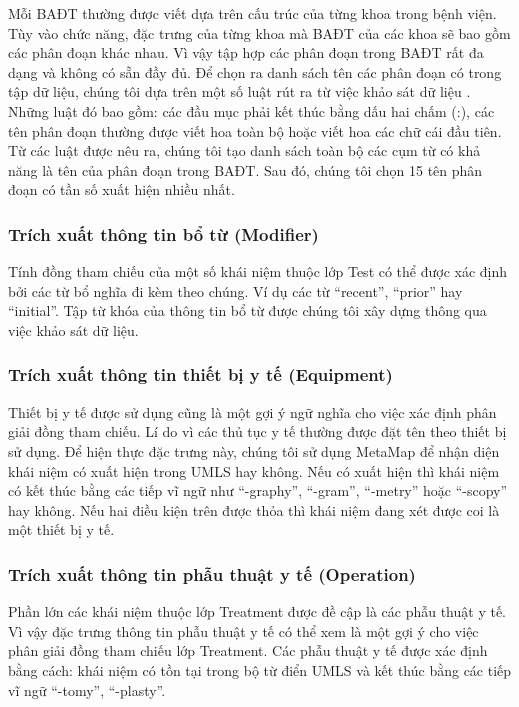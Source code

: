 Mỗi BAĐT thường được viết dựa trên cấu trúc của từng khoa trong bệnh viện. Tùy vào chức năng, đặc trưng của từng khoa mà BAĐT của các khoa sẽ bao gồm các phân đoạn khác nhau. Vì vậy tập hợp các phân đoạn trong BAĐT rất đa dạng và không có sẵn đầy đủ. Để chọn ra danh sách tên các phân đoạn có trong tập dữ liệu, chúng tôi dựa trên một số luật rút ra từ việc khảo sát dữ liệu \cite{RandolphMiller2008}. Những luật đó bao gồm: các đầu mục phải kết thúc bằng dấu hai chấm (:), các tên phân đoạn thường được viết hoa toàn bộ hoặc viết hoa các chữ cái đầu tiên. Từ các luật được nêu ra, chúng tôi tạo danh sách toàn bộ các cụm từ có khả năng là tên của phân đoạn trong BAĐT. Sau đó, chúng tôi chọn 15 tên phân đoạn có tần số xuất hiện nhiều nhất.

\subsubsection*{Trích xuất thông tin bổ từ (Modifier)}
Tính đồng tham chiếu của một số khái niệm thuộc lớp Test có thể được xác định bởi các từ bổ nghĩa đi kèm theo chúng. Ví dụ các từ “recent”, “prior” hay “initial”. Tập từ khóa của thông tin bổ từ được chúng tôi xây dựng thông qua việc khảo sát dữ liệu.

\subsubsection*{Trích xuất thông tin thiết bị y tế (Equipment)}
Thiết bị y tế được sử dụng cũng là một gợi ý ngữ nghĩa cho việc xác định phân giải đồng tham chiếu. Lí do vì các thủ tục y tế thường được đặt tên theo thiết bị sử dụng. Để hiện thực đặc trưng này, chúng tôi sử dụng MetaMap để nhận diện khái niệm có xuất hiện trong UMLS hay không. Nếu có xuất hiện thì khái niệm có kết thúc bằng các tiếp vĩ ngữ như ``-graphy'', ``-gram'', ``-metry'' hoặc ``-scopy'' hay không. Nếu hai điều kiện trên được thỏa thì khái niệm đang xét được coi là một thiết bị y tế.

\subsubsection*{Trích xuất thông tin phẫu thuật y tế (Operation)}
Phần lớn các khái niệm thuộc lớp Treatment được đề cập là các phẫu thuật y tế. Vì vậy đặc trưng thông tin phẫu thuật y tế có thể xem là một gợi ý cho việc phân giải đồng tham chiếu lớp Treatment. Các phẫu thuật y tế được xác định bằng cách: khái niệm có tồn tại trong bộ từ điển UMLS và kết thúc bằng các tiếp vĩ ngữ ``-tomy'', ``-plasty''.

